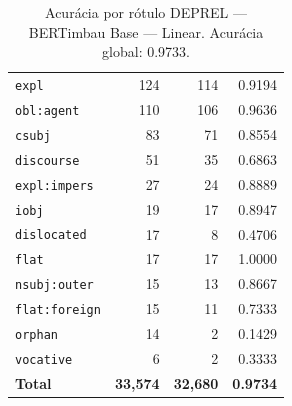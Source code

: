 \begin{table}[ht]
\begin{tabular}{lrrr}
\texttt{expl} & 124 & 114 & 0.9194 \\
\texttt{obl\!:\!agent} & 110 & 106 & 0.9636 \\
\texttt{csubj} & 83 & 71 & 0.8554 \\
\texttt{discourse} & 51 & 35 & 0.6863 \\
\texttt{expl\!:\!impers} & 27 & 24 & 0.8889 \\
\texttt{iobj} & 19 & 17 & 0.8947 \\
\texttt{dislocated} & 17 & 8 & 0.4706 \\
\texttt{flat} & 17 & 17 & 1.0000 \\
\texttt{nsubj\!:\!outer} & 15 & 13 & 0.8667 \\
\texttt{flat\!:\!foreign} & 15 & 11 & 0.7333 \\
\texttt{orphan} & 14 & 2 & 0.1429 \\
\texttt{vocative} & 6 & 2 & 0.3333 \\
\midrule
\textbf{Total} & \textbf{33,574} & \textbf{32,680} & \textbf{0.9734} \\
\bottomrule
\end{tabular}
\caption{Acurácia por rótulo DEPREL — BERTimbau Base — Linear. Acurácia global: 0.9733.}
\label{tab:deprel-acc-predict-test-df-bertimbau-base-linear}
\end{table}

